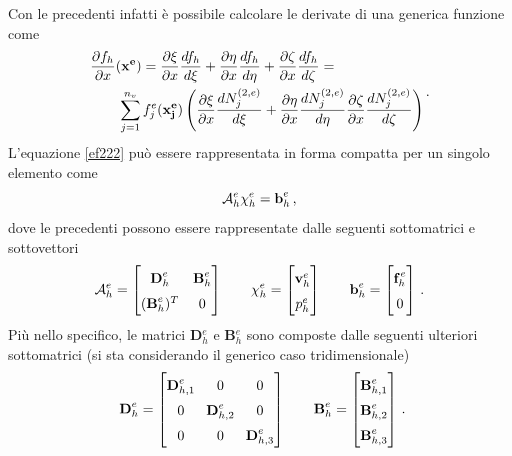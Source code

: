 Con le precedenti infatti è possibile calcolare le derivate di una generica funzione come
\begin{equation}
\begin{split}
	& \frac{\partial f_h}{\partial x}({\bf x^e})=\frac{\partial \xi}{\partial x}\frac{d f_h}{d \xi}
+\frac{\partial \eta}{\partial x}\frac{d f_h}{d \eta}
+\frac{\partial \zeta}{\partial x}\frac{d f_h}{d \zeta}= \\
	& \quad \quad \sum_{j=1}^{n_v} f_j^e({\bf x_j^e}) \left(
\frac{\partial \xi}{\partial x}\frac{d N_j^{(2,e)}}{d \xi}+
\frac{\partial \eta}{\partial x}\frac{d N_j^{(2,e)}}{d \eta}
\frac{\partial \zeta}{\partial x}\frac{d N_j^{(2,e)}}{d \zeta}
\right)
\end{split}\,.
\end{equation}
L'equazione \eqref{ef222} può essere rappresentata in forma compatta per un singolo elemento come
\begin{equation}
\mathcal{A}_{h}^{e}{\bf \chi}_{h}^{e}=\textbf{b}_{h}^{e}\,,
\end{equation}
dove le precedenti possono essere rappresentate dalle seguenti
sottomatrici 
e sottovettori
\begin{eqnarray}\renewcommand{\arraystretch}{1.5}\setlength{\arraycolsep}{5pt}
\mathcal{A}_h^e=
\begin{bmatrix}
\textbf{D}_h^e & \textbf{B}_h^e\\
(\textbf{B}_h^e)^T & 0
\end{bmatrix} \qquad
{\bf \chi}_h^e= \begin{bmatrix}
{\bf v}_h^e \\
 p_h^e
\end{bmatrix} \qquad
\textbf{b}_h^e= \begin{bmatrix}
\textbf{f}_h^{\,e} \\
 0
\end{bmatrix}\,.
\end{eqnarray}
Più nello specifico, le matrici \textbf{D}$_h^e$ e \textbf{B}$_h^e$ sono composte dalle seguenti
ulteriori sottomatrici (si sta considerando il generico caso tridimensionale)
\begin{eqnarray}\renewcommand{\arraystretch}{1.5}\setlength{\arraycolsep}{4pt}
\textbf{ D}_h^e= \begin{bmatrix}
\textbf{D}_{h,1}^e & 0 & 0\\
0 & \textbf{D}_{h,2}^e & 0\\
0 & 0 & \textbf{D}_{h,3}^e
\end{bmatrix} \qquad
\textbf{B}_h^e=
\begin{bmatrix}
\textbf{B}_{h,1}^e \\
 \textbf{B}_{h,2}^e \\
 \textbf{B}_{h,3}^e
\end{bmatrix}\,.
\end{eqnarray}
